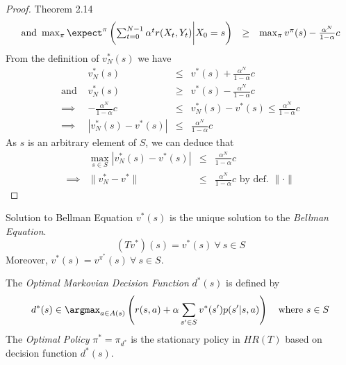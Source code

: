 \documentclass[11pt,a4paper]{article}
\begin{document}
\begin{proof}{Theorem 2.14}
\[\begin{array}{rcl}
      \text{and }\max_\pi\expect^\pi\left(\sum_{t=0}^{N-1}\alpha^tr(X_t,Y_t)\bigg|X_0=s\right)&\geq&\max_\pi v^\pi(s)-\frac{\alpha^N}{1-\alpha}c\\
    \end{array}\]
    From the definition of $v_N^*(s)$ we have
    \[\begin{array}{rrcl}
      &v_N^*(s)&\leq&v^*(s)+\frac{\alpha^N}{1-\alpha}c\\
      \text{and }&v_N^*(s)&\geq&v^*(s)-\frac{\alpha^N}{1-\alpha}c\\
      \implies&-\frac{\alpha^N}{1-\alpha}c&\leq&v_N^*(s)-v^*(s)\leq\frac{\alpha^N}{1-\alpha}c\\
      \implies&|v_N^*(s)-v^*(s)|&\leq&\frac{\alpha^N}{1-\alpha}c
    \end{array}\]
    As $s$ is an arbitrary element of $S$, we can deduce that
    \[\begin{array}{rrcl}
      &\max_{s\in S}|v_N^*(s)-v^*(s)|&\leq&\frac{\alpha^N}{1-\alpha}c\\
      \implies&\|v_N^*-v^*\|&\leq&\frac{\alpha^N}{1-\alpha}c\text{ by def. }\|\cdot\|
    \end{array}\]
    \proved
  \end{proof}

  \begin{theorem}{Solution to Bellman Equation}
    $v^*(s)$ is the unique solution to the \textit{Bellman Equation}.
    \[ (Tv^*)(s)=v^*(s)\ \forall\ s\in S \]
    Moreover, $v^*(s)=v^{\pi^*}(s)\ \forall\ s\in S$.
    \par The \textit{Optimal Markovian Decision Function} $d^*(s)$ is defined by
    \[ d^*(s)\in\argmax_{a\in A(s)}\left(r(s,a)+\alpha\sum_{s'\in S}v^*(s')p(s'|s,a)\right)\quad\text{where }s\in S \]
    The \textit{Optimal Policy} $\pi^*=\pi_{d^*}$ is the stationary policy in $HR(T)$ based on decision function $d^*(s)$.
  \end{theorem}
\end{document}
